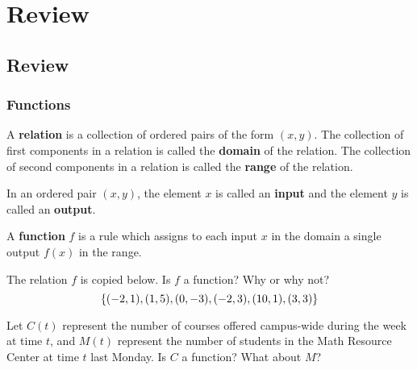 \documentclass[notes]{subfiles}
\begin{document}
	\setcounter{chapter}{-1}
	\chapter{Review}
	\setcounter{section}{0}
	\setcounter{page}{1}
	\fancyhead[LO,RE]{\bfseries \currentname}
	\fancyfoot[C]{{}}
	\fancyfoot[LO,RE]{\large \thepage}	%

\section*{Review}\label{csr}
	
	\subsection*{Functions}
		\begin{defn}
			A \textbf{relation} is a collection of ordered pairs of the form \((x,y)\). The collection of first components in a relation is called the \textbf{domain} of the relation. The collection of second components in a relation is called the \textbf{range} of the relation.
		\end{defn}
		
		\begin{defn}
			In an ordered pair \((x,y)\), the element \(x\) is called an \textbf{input} and the element \(y\) is called an \textbf{output}. 
		\end{defn}
		
		\begin{defn}[Function]
			A \textbf{function} \(f\) is a rule which assigns to each input \(x\) in the domain a single output \(f(x)\) in the range.
		\end{defn}
		
		\begin{ex}
			The relation \(f\) is copied below. Is \(f\) a function? Why or why not?
			\[\left\lbrace (-2,1), (1,5), (0,-3), (-2,3), (10,1), (3,3) \right\rbrace\]
		\end{ex}
			\newpage
			
		\begin{ex}
			Let \(C(t)\) represent the number of courses offered campus-wide during the week at time \(t\), and \(M(t)\) represent the number of students in the Math Resource Center at time \(t\) last Monday.   Is \(C\) a function?  What about \(M\)?
		\end{ex}
		
\end{document}
